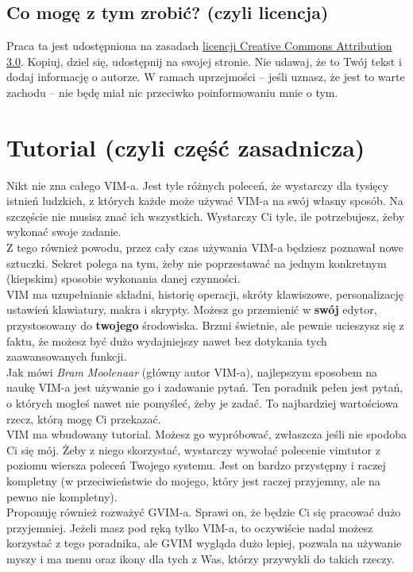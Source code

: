 \documentclass[a4paper,12pt]{article}
\begin{document}
\subsection{Co mogę z tym zrobić? (czyli licencja)}
Praca ta jest udostępniona na zasadach \href{http://creativecommons.org/licenses/by/3.0/pl/}{licencji Creative Commons Attribution 3.0}. Kopiuj, dziel się, udostępnij na swojej stronie. Nie udawaj, że to Twój tekst i dodaj informację o autorze. W ramach uprzejmości – jeśli uznasz, że jest to warte zachodu – nie będę miał nic przeciwko poinformowaniu mnie o tym.
\section{Tutorial (czyli część zasadnicza)}

Nikt nie zna całego VIM-a. Jest tyle różnych poleceń, że wystarczy dla tysięcy istnień ludzkich, z których każde może używać VIM-a na swój własny sposób. Na szczęście nie musisz znać ich wszystkich. Wystarczy Ci tyle, ile potrzebujesz, żeby wykonać swoje zadanie.\\
Z tego również powodu, przez cały czas używania VIM-a będziesz poznawał nowe sztuczki. Sekret polega na tym, żeby nie poprzestawać na jednym konkretnym (kiepskim) sposobie wykonania danej czynności.\\
VIM ma uzupełnianie składni, historię operacji, skróty klawiszowe, personalizację ustawień klawiatury, makra i skrypty. Możesz go przemienić w {\bf swój} edytor, przystosowany do {\bf twojego} środowiska. Brzmi świetnie, ale pewnie ucieszysz się z faktu, że możesz być dużo wydajniejszy nawet bez dotykania tych zaawansowanych funkcji.\\
Jak mówi {\it Bram Moolenaar} (główny autor VIM-a), najlepszym sposobem na naukę VIM-a jest używanie go i zadawanie pytań. Ten poradnik pełen jest pytań, o których mogłeś nawet nie pomyśleć, żeby je zadać. To najbardziej wartościowa rzecz, którą mogę Ci przekazać.\\
VIM ma wbudowany tutorial. Możesz go wypróbować, zwłaszcza jeśli nie spodoba Ci się mój. Żeby z niego skorzystać, wystarczy wywołać polecenie vimtutor z poziomu wiersza poleceń Twojego systemu. Jest on bardzo przystępny i raczej kompletny (w przeciwieństwie do mojego, który jest raczej przyjemny, ale na pewno nie kompletny).\\
Proponuję również rozważyć GVIM-a. Sprawi on, że będzie Ci się pracować dużo przyjemniej. Jeżeli masz pod ręką tylko VIM-a, to oczywiście nadal możesz korzystać z tego poradnika, ale GVIM wygląda dużo lepiej, pozwala na używanie myszy i ma menu oraz ikony dla tych z Was, którzy przywykli do takich rzeczy.
\end{document}
